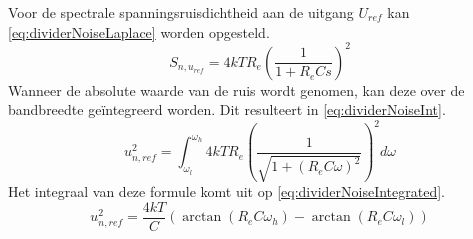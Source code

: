 Voor de spectrale spanningsruisdichtheid aan de uitgang $U_{ref}$ kan \autoref{eq:dividerNoiseLaplace} worden opgesteld.
\begin{equation}\label{eq:dividerNoiseLaplace}
    S_{n,u_{ref}} = 4kTR_e\left(\frac{1}{1 + R_eCs}\right)^2
\end{equation}
Wanneer de absolute waarde van de ruis wordt genomen, kan deze over de bandbreedte geïntegreerd worden. Dit resulteert in \autoref{eq:dividerNoiseInt}.
\begin{equation}\label{eq:dividerNoiseInt}
    u_{n,ref}^2 = \int_{\omega_l}^{\omega_h} 4kTR_e\left(\frac{1}{\sqrt{1 + (R_eC\omega)^2}}\right)^2 d\omega
\end{equation}
Het integraal van deze formule komt uit op \autoref{eq:dividerNoiseIntegrated}.
\begin{equation}\label{eq:dividerNoiseIntegrated}
    u_{n,ref}^2 = \frac{4kT}{C}\left(\arctan(R_eC\omega_h) - \arctan(R_eC\omega_l)\right)
\end{equation}